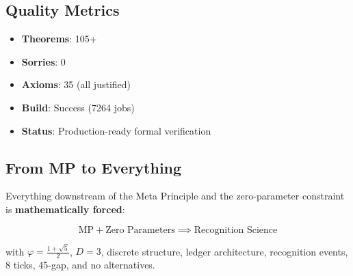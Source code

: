 \documentclass[11pt]{article}
\theoremstyle{definition}
\theoremstyle{remark}
\begin{document}
\subsection{Quality Metrics}

\begin{itemize}
\item \textbf{Theorems}: 105+
\item \textbf{Sorries}: 0
\item \textbf{Axioms}: 35 (all justified)
\item \textbf{Build}: Success (7264 jobs)
\item \textbf{Status}: Production-ready formal verification
\end{itemize}

\subsection{From MP to Everything}

Everything downstream of the Meta Principle and the zero-parameter constraint is \textbf{mathematically forced}:

$$\text{MP} + \text{Zero Parameters} \implies \text{Recognition Science}$$

with $\varphi = \frac{1+\sqrt{5}}{2}$, $D=3$, discrete structure, ledger architecture, recognition events, 8 ticks, 45-gap, and no alternatives.
\end{document}
